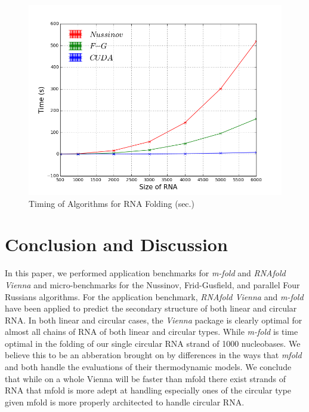 \documentclass[12pt]{article}
\begin{document}
\begin{figure}[H]
  \centering
  \includegraphics[keepaspectratio, scale=.6]{algorithmGraph.png}
  \caption{Timing of Algorithms for RNA Folding (sec.)}
  \label{fig:timingAlgorithm}
\end{figure}

\section{Conclusion and Discussion}
\par In this paper, we performed application benchmarks for \textit{m-fold} and \textit{RNAfold Vienna} and
micro-benchmarks for the Nussinov, Frid-Gusfield, and parallel Four Russians algorithms. For the
application benchmark, \textit{RNAfold Vienna} and \textit{m-fold} have been applied to predict
the secondary structure of both linear and circular RNA. In both linear and circular cases, the
\textit{Vienna} package is clearly optimal for almost all chains of RNA of both linear and circular types.  While
\textit{m-fold} is time optimal in the folding of our single circular RNA strand of 1000 nucleobases. We
believe this to be an abberation brought on by differences in the ways that \textit{mfold} and 
both handle the evaluations of their thermodynamic models. We conclude that while on a whole Vienna will
be faster than mfold there exist strands of RNA that mfold is more adept at handling especially ones of the
circular type given mfold is more properly architected to handle circular RNA.
\end{document}
